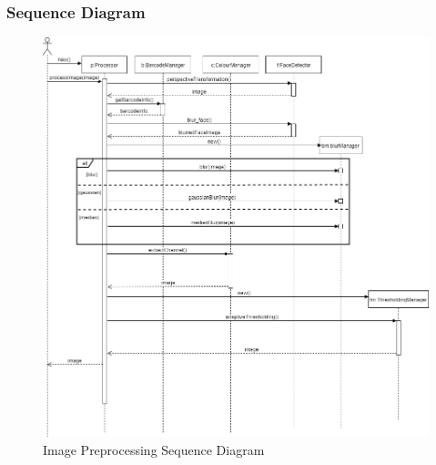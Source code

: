 \documentclass{article}
\begin{document}
\subsubsection{Sequence Diagram}
\begin{figure}[H]
	    \centering
	    \includegraphics[scale=0.5]{img/image_processing_sequence.png}
	    \caption{Image Preprocessing Sequence Diagram}
	 \end{figure}
\end{document}
